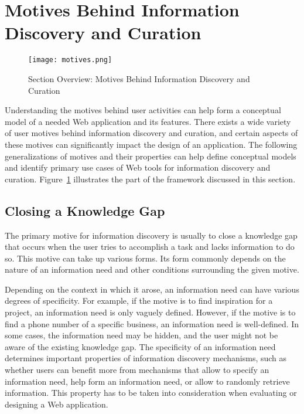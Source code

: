 {\section{Motives Behind Information Discovery and Curation}

\label{section:motives}
\begin{figure}[ht!]
	\noindent
	\centering
	\texttt{[image: motives.png]}
	\caption{Section Overview: Motives Behind Information Discovery and Curation}
	\label{fig:motives} 
\end{figure}

Understanding the motives behind user activities can help form a conceptual model of a needed Web application and its features. There exists a wide variety of user motives behind information discovery and curation, and certain aspects of these motives can significantly impact the design of an application. The following generalizations of motives and their properties can help define conceptual models and identify primary use cases of Web tools for information discovery and curation. Figure~\ref{fig:motives} illustrates the part of the framework discussed in this section.  

{\subsection{Closing a Knowledge Gap}
The primary motive for information discovery is usually to close a knowledge gap that occurs when the user tries to accomplish a task and lacks information to do so. This motive can take up various forms. Its form commonly depends on the nature of an information need and other conditions surrounding the given motive.        

Depending on the context in which it arose, an information need can have various degrees of specificity. For example, if the motive is to find inspiration for a project, an information need is only vaguely defined. However, if the motive is to find a phone number of a specific business, an information need is well-defined. In some cases, the information need may be hidden, and the user might not be aware of the existing knowledge gap. The specificity of an information need determines important properties of information discovery mechanisms, such as whether users can benefit more from mechanisms that allow to specify an information need, help form an information need, or allow to randomly retrieve information. This property has to be taken into consideration when evaluating or designing a Web application. 

}}

